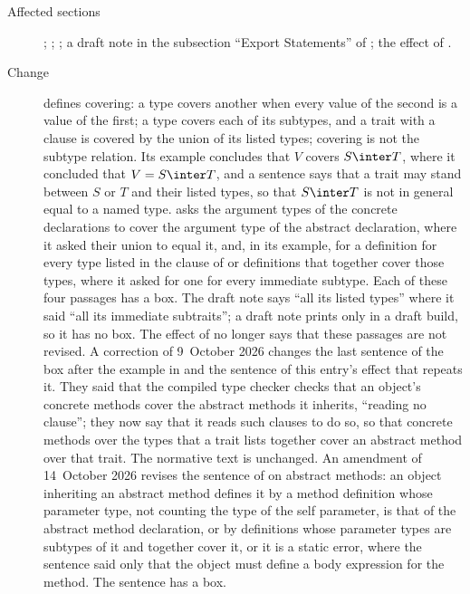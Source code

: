 \begin{description}
\item[Affected sections] ;
; ; a draft note in the
subsection ``Export Statements'' of ; the effect of
.
\item[Change]  defines covering: a type covers another
when every value of the second is a value of the first; a type covers each of
its subtypes, and a trait with a  clause is covered by the union
of its listed types; covering is not the subtype relation.
Its example concludes that $V$ covers $S \inter T$, where it concluded that
$V = S \inter T$, and a sentence says that a trait may stand between $S$ or $T$
and their listed types, so that $S \inter T$ is not in general equal to a named
type.
 asks the argument types of the concrete
declarations to cover the argument type of the abstract declaration, where it
asked their union to equal it, and, in its example, for a definition for every
type listed in the  clause of  or definitions that
together cover those types, where it asked for one for every immediate subtype.
Each of these four passages has a box.
The draft note says ``all its listed types'' where it said ``all its immediate
subtraits''; a draft note prints only in a draft build, so it has no box.
The effect of  no longer says that these passages are
not revised.
A correction of 9~October 2026 changes the last sentence of the box after the
example in  and the sentence of this
entry's effect that repeats it.
They said that the compiled type checker checks that an object's concrete
methods cover the abstract methods it inherits, ``reading no 
clause''; they now say that it reads such clauses to do so, so that concrete
methods over the types that a trait lists together cover an abstract method
over that trait.
The normative text is unchanged.
An amendment of 14~October 2026 revises the sentence of  on
abstract methods: an object inheriting an abstract method defines it by a method
definition whose parameter type, not counting the type of the self parameter, is
that of the abstract method declaration, or by definitions whose parameter types
are subtypes of it and together cover it, or it is a static error, where the
sentence said only that the object must define a body expression for the method.
The sentence has a box.

\end{description}
